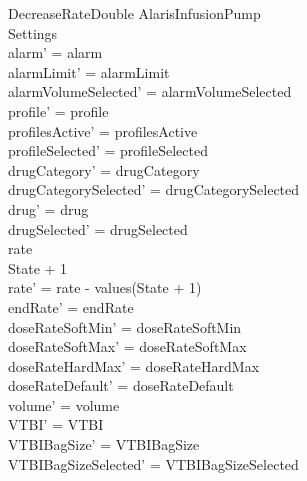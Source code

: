 \begin{schema}{DecreaseRateDouble}
	\Delta AlarisInfusionPump\\
	Settings\\
	\where
	alarm' = alarm\\
	alarmLimit' = alarmLimit\\
	alarmVolumeSelected' = alarmVolumeSelected\\
	profile' = profile\\
	profilesActive' = profilesActive\\  
	  profileSelected' = profileSelected\\
	drugCategory' = drugCategory\\ drugCategorySelected' = drugCategorySelected\\
	drug' = drug\\ drugSelected' = drugSelected\\
	rate \\
	State + 1 \\
	rate' = rate - values(State + 1)\\
	endRate' = endRate\\
	doseRateSoftMin' = doseRateSoftMin\\
	doseRateSoftMax' = doseRateSoftMax\\
	doseRateHardMax' = doseRateHardMax\\
	doseRateDefault' = doseRateDefault\\
	volume' = volume\\
	VTBI' = VTBI\\
	VTBIBagSize' = VTBIBagSize\\ VTBIBagSizeSelected' = VTBIBagSizeSelected\\

\end{schema}
